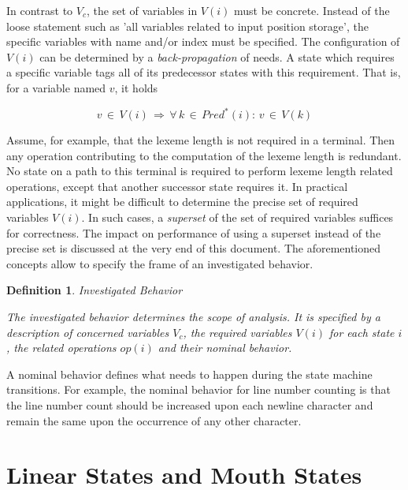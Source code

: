 \documentclass[12pt,a4paper]{scrartcl}
\newtheorem{definition}{Definition}
\begin{document}
In contrast to $V_c$, the set of variables in $V(i)$ must be concrete.  Instead
of the loose statement such as 'all variables related to input position
storage', the specific variables with name and/or index must be specified.  The
configuration of $V(i)$ can be determined by a \textit{back-propagation} of
needs. A state which requires a specific variable tags all of its predecessor
states with this requirement. That is, for a variable named $v$, it holds

\begin{equation}
    v\,\in\,V(i)\,\Rightarrow\,\forall\,k\,\in\,Pred^*(i):\,v\,\in\,V(k)
\end{equation}

Assume, for example, that the lexeme length is not required in a terminal. Then
any operation contributing to the computation of the lexeme length is
redundant.  No state on a path to this terminal is required to perform lexeme
length related operations, except that another successor state requires it.  In
practical applications, it might be difficult to determine the precise set of
required variables $V(i)$. In such cases, a \textit{superset} of the set of
required variables suffices for correctness. The impact on performance of using
a superset instead of the precise set is discussed at the very end of this
document.  The aforementioned concepts allow to specify the frame of an
investigated behavior.  \begin{definition} Investigated Behavior 

The investigated behavior determines the scope of analysis. It is
specified by a description of concerned variables $V_c$, the required
variables $V(i)$ for each state $i$, the related operations $op(i)$ and
their nominal behavior.
\end{definition}
    
A nominal behavior defines what needs to happen during the state machine
transitions.  For example, the nominal behavior for line number counting is
that the line number count should be increased upon each newline character
and remain the same upon the occurrence of any other character. 

%
\section{Linear States and Mouth States}
\end{document}

